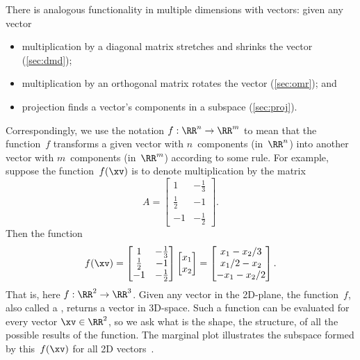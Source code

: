 There is analogous functionality in multiple dimensions with vectors: given any vector 
\begin{itemize}
\item multiplication by a diagonal matrix stretches and shrinks the vector (\autoref{sec:dmd});
\item multiplication by an orthogonal matrix rotates the vector (\autoref{sec:omr});
and \item projection finds a vector's components in a subspace (\autoref{sec:proj}).
\end{itemize}
Correspondingly, we use the notation \(f:\RR^n\to\RR^m\) to mean that the function~\(f\) transforms a given vector with \(n\)~components (in~\(\RR^n\)) into another vector with \(m\)~components (in~\(\RR^m\)) according to some rule. 
For example, suppose the function~\(f(\xv)\) is to denote multiplication by the matrix
\begin{equation*}
A=\begin{bmatrix} 1&-\frac13\\\frac12&-1\\-1&-\frac12 \end{bmatrix}.
\end{equation*}
Then the function
\begin{equation*}
f(\xv)=\begin{bmatrix} 1&-\frac13\\\frac12&-1\\-1&-\frac12 \end{bmatrix}\begin{bmatrix} x_1\\x_2 \end{bmatrix}
=\begin{bmatrix} x_1-x_2/3\\x_1/2-x_2\\-x_1-x_2/2 \end{bmatrix}.
\end{equation*}
%
That is, here \(f:\RR^2\to\RR^3\).  
Given any vector in the 2D-plane, the function~\(f\), also called a , returns a vector in 3D-space.  
Such a function can be evaluated for every vector \(\xv\in\RR^2\), so we ask what is the shape, the structure, of all the possible results of the function.
The marginal plot illustrates the subspace formed by this~\(f(\xv)\) for all 2D vectors~\xv.


